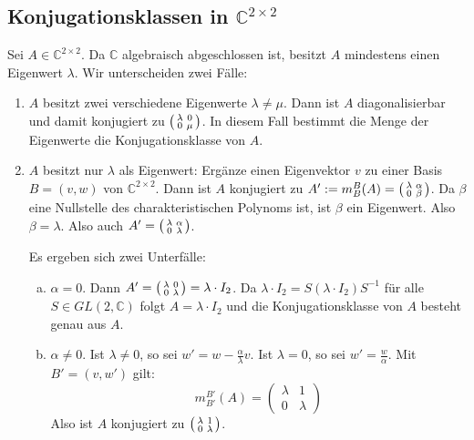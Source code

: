 \subsection{Konjugationsklassen in $\mathds{C}^{2 \times 2}$} %
\label{sub:55}
Sei $A \in \mathds{C}^{2 \times 2}$. Da $\mathds{C}$ algebraisch abgeschlossen ist, besitzt $A$ mindestens einen Eigenwert $\lambda$. Wir unterscheiden zwei Fälle:
\begin{enumerate}[1)]
	\item $A$ besitzt zwei verschiedene Eigenwerte $\lambda \not= \mu$. Dann ist $A$ diagonalisierbar und damit konjugiert zu 
	$\enbrace*{\begin{smallmatrix}\lambda  & 0 \\ 0 & \mu \end{smallmatrix}}$. In diesem Fall bestimmt die Menge der Eigenwerte die Konjugationsklasse von $A$.
	\item $A$ besitzt nur $\lambda $ als Eigenwert: Ergänze einen Eigenvektor $v$ zu einer Basis $B=(v,w)$ von $\mathds{C}^{2 \times 2}$. Dann ist $A$ konjugiert zu 
	$A' := m_B^B(A) = \enbrace*{\begin{smallmatrix}\lambda  & \alpha \\ 0 & \beta \end{smallmatrix}}$. Da $\beta$ eine Nullstelle des charakteristischen Polynoms ist, 
	ist $\beta$ ein Eigenwert. Also $\beta = \lambda $. Also auch $A'  = \enbrace*{\begin{smallmatrix}\lambda  & \alpha \\ 0 & \lambda  \end{smallmatrix}}$. 
	
	Es ergeben sich zwei Unterfälle:
	\begin{enumerate}[a)]
		\item $\alpha = 0$. Dann $A' = \enbrace*{\begin{smallmatrix}\lambda  & 0 \\ 0 & \lambda  \end{smallmatrix}} = \lambda \cdot I_2$. Da 
		$\lambda \cdot  I_2 = S (\lambda \cdot I_2) S ^{-1}$ für alle $S \in GL(2,\mathds{C})$ folgt $A=\lambda \cdot I_2$ und die Konjugationsklasse von $A$ besteht 
		genau aus $A$.
		\item $\alpha \not= 0$. Ist $\lambda \not= 0$, so sei $w' = w - \frac{\alpha}{\lambda } v$. Ist $\lambda = 0$, so sei $w'= \frac{w}{\alpha} $. Mit 
		$B'= (v,w')$ gilt:
		\[
			m_{B'}^{B'}(A) = \begin{pmatrix}
				\lambda & 1 \\
				0 & \lambda 
			\end{pmatrix}
		\]
		Also ist $A $ konjugiert zu $\enbrace*{\begin{smallmatrix}\lambda  & 1 \\ 0 & \lambda  \end{smallmatrix}}$.
	\end{enumerate}
\end{enumerate}

